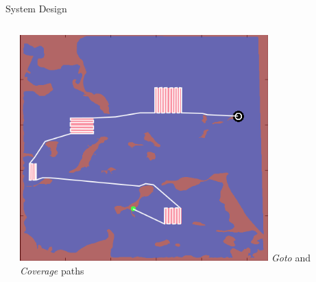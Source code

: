\documentclass[9pt]{beamer}
\begin{document}
\begin{frame}{System Design}
\begin{columns}
\begin{column}{0.5\textwidth}
        \end{column}
        \begin{column}{0.5\textwidth}
            \begin{center}
                \includegraphics[width=0.75\textwidth,trim={0cm 0cm 0cm 0cm},clip]{img/surveyor_2.png}
                \newline
                \textit{Goto} and \textit{Coverage} paths
            \end{center}
        \end{column}
    \end{columns}
\end{frame}
\end{document}
